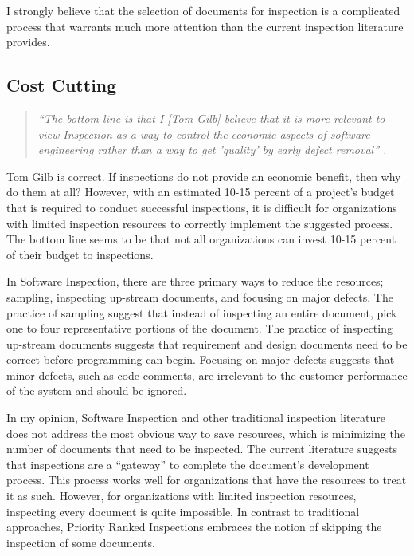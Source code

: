 I strongly believe that the selection of documents for inspection is a
complicated process that warrants much more attention than the current
inspection literature provides. 

\subsection{Cost Cutting}
\begin{quotation}
  \textit{``The bottom line is that I [Tom Gilb] believe that it is more
    relevant to view Inspection as a way to control the economic aspects of
    software engineering rather than a way to get 'quality' by early defect
    removal'' \cite{Gilb99}.  }
\end{quotation}

Tom Gilb is correct. If inspections do not provide an economic benefit,
then why do them at all? However, with an estimated 10-15 percent of a
project's budget that is required to conduct successful inspections, it is
difficult for organizations with limited inspection resources to correctly
implement the suggested process. The bottom line seems to be that not all
organizations can invest 10-15 percent of their budget to inspections.

In Software Inspection, there are three primary ways to reduce the
resources; sampling, inspecting up-stream documents, and focusing on major
defects. The practice of sampling suggest that instead of inspecting an
entire document, pick one to four representative portions of the document.
The practice of inspecting up-stream documents suggests that requirement
and design documents need to be correct before programming can begin.
Focusing on major defects suggests that minor defects, such as code
comments, are irrelevant to the customer-performance of the system and
should be ignored.

In my opinion, Software Inspection and other traditional inspection
literature does not address the most obvious way to save resources, which
is minimizing the number of documents that need to be inspected. The
current literature suggests that inspections are a ``gateway'' to complete
the document's development process. This process works well for
organizations that have the resources to treat it as such. However, for
organizations with limited inspection resources, inspecting every document
is quite impossible. In contrast to traditional approaches, Priority Ranked
Inspections embraces the notion of skipping the inspection of some
documents.

